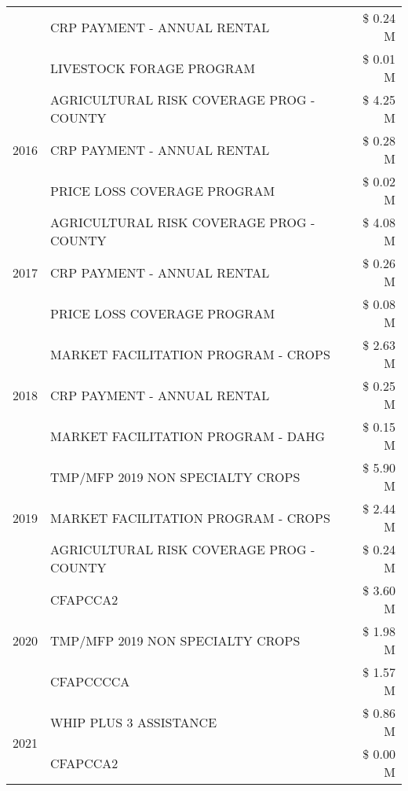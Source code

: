 \begin{tabular}{llr}
 & CRP PAYMENT - ANNUAL RENTAL & \$ 0.24 M \\
 & LIVESTOCK FORAGE PROGRAM & \$ 0.01 M \\
\cline{1-3}
\multirow[t]{3}{*}{2016} & AGRICULTURAL RISK COVERAGE PROG - COUNTY      & \$ 4.25 M \\
 & CRP PAYMENT - ANNUAL RENTAL                   & \$ 0.28 M \\
 & PRICE LOSS COVERAGE PROGRAM                   & \$ 0.02 M \\
\cline{1-3}
\multirow[t]{3}{*}{2017} & AGRICULTURAL RISK COVERAGE PROG - COUNTY & \$ 4.08 M \\
 & CRP PAYMENT - ANNUAL RENTAL & \$ 0.26 M \\
 & PRICE LOSS COVERAGE PROGRAM & \$ 0.08 M \\
\cline{1-3}
\multirow[t]{3}{*}{2018} & MARKET FACILITATION PROGRAM - CROPS & \$ 2.63 M \\
 & CRP PAYMENT - ANNUAL RENTAL & \$ 0.25 M \\
 & MARKET FACILITATION PROGRAM - DAHG & \$ 0.15 M \\
\cline{1-3}
\multirow[t]{3}{*}{2019} & TMP/MFP 2019 NON SPECIALTY CROPS & \$ 5.90 M \\
 & MARKET FACILITATION PROGRAM - CROPS & \$ 2.44 M \\
 & AGRICULTURAL RISK COVERAGE PROG - COUNTY & \$ 0.24 M \\
\cline{1-3}
\multirow[t]{3}{*}{2020} & CFAPCCA2 & \$ 3.60 M \\
 & TMP/MFP 2019 NON SPECIALTY CROPS & \$ 1.98 M \\
 & CFAPCCCCA & \$ 1.57 M \\
\cline{1-3}
\multirow[t]{2}{*}{2021} & WHIP PLUS 3 ASSISTANCE & \$ 0.86 M \\
 & CFAPCCA2 & \$ 0.00 M \\
\cline{1-3}
\bottomrule
\end{tabular}
